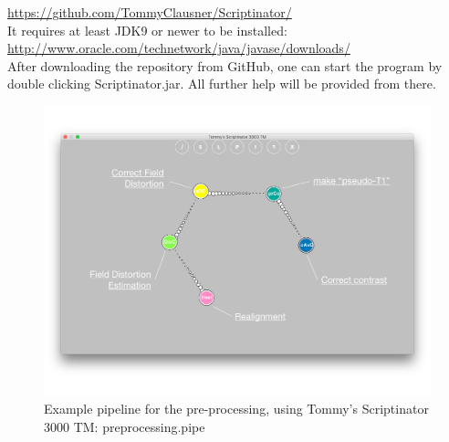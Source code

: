\documentclass[12pt,a4paper]{scrartcl}
\begin{document}
\href{https://github.com/TommyClausner/Scriptinator/}{https://github.com/TommyClausner/Scriptinator/}\\

\noindent It requires at least JDK9 or newer to be installed:\\

\href{http://www.oracle.com/technetwork/java/javase/downloads/}{http://www.oracle.com/technetwork/java/javase/downloads/}\\

\noindent After downloading the repository from GitHub, one can start the program by double clicking Scriptinator.jar. All further help will be provided from there.


\begin{figure}[h]
\begin{center}
\includegraphics[width=\textwidth]{preproc-pipe}
\caption[Pre-processing Pipeline]{Example pipeline for the pre-processing, using Tommy's Scriptinator 3000 TM: preprocessing.pipe}
\end{center}
\end{figure}
\end{document}
